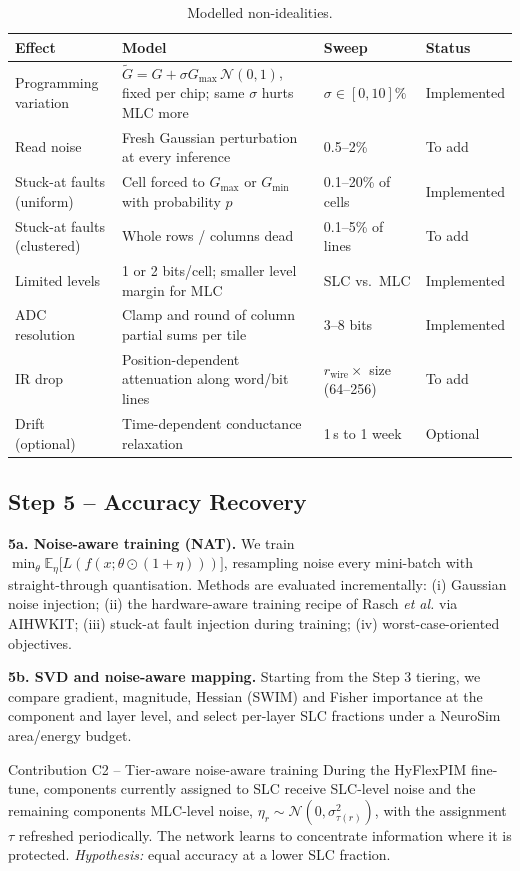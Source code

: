 \documentclass[10pt,a4paper]{article}
\begin{document}
\begin{table}[h]
\centering\small
\caption{Modelled non-idealities.}\label{tab:noise}
\begin{tabularx}{\linewidth}{@{}l X l l@{}}
\toprule
Effect & Model & Sweep & Status \\
\midrule
Programming variation & $\tilde G=G+\sigma G_{\max}\,\mathcal N(0,1)$, fixed per chip; same $\sigma$ hurts MLC more & $\sigma\in[0,10]\%$ & Implemented \\
Read noise & Fresh Gaussian perturbation at every inference & 0.5--2\% & To add \\
Stuck-at faults (uniform) & Cell forced to $G_{\max}$ or $G_{\min}$ with probability $p$ & 0.1--20\% of cells & Implemented \\
Stuck-at faults (clustered) & Whole rows / columns dead & 0.1--5\% of lines & To add \\
Limited levels & 1 or 2 bits/cell; smaller level margin for MLC & SLC vs.\ MLC & Implemented \\
ADC resolution & Clamp and round of column partial sums per tile & 3--8 bits & Implemented \\
IR drop & Position-dependent attenuation along word/bit lines & $r_{\mathrm{wire}}\times$ size (64--256) & To add \\
Drift (optional) & Time-dependent conductance relaxation & 1\,s to 1 week & Optional \\
\bottomrule
\end{tabularx}
\end{table}

\subsection{Step 5 -- Accuracy Recovery}
\textbf{5a. Noise-aware training (NAT).} We train
$\min_\theta \mathbb E_\eta\big[L(f(x;\theta\odot(1+\eta)))\big]$, resampling noise every mini-batch with
straight-through quantisation. Methods are evaluated incrementally: (i) Gaussian noise injection;
(ii) the hardware-aware training recipe of Rasch \emph{et al.} via AIHWKIT; (iii) stuck-at fault injection
during training; (iv) worst-case-oriented objectives.

\textbf{5b. SVD and noise-aware mapping.} Starting from the Step 3 tiering, we compare gradient,
magnitude, Hessian (SWIM) and Fisher importance at the component and layer level, and select per-layer
SLC fractions under a NeuroSim area/energy budget.

\begin{contribbox}{Contribution C2 -- Tier-aware noise-aware training}
During the HyFlexPIM fine-tune, components currently assigned to SLC receive SLC-level noise and the
remaining components MLC-level noise, $\eta_r\sim\mathcal N(0,\sigma^2_{\tau(r)})$, with the assignment
$\tau$ refreshed periodically. The network learns to concentrate information where it is protected.
\emph{Hypothesis:} equal accuracy at a lower SLC fraction.
\end{contribbox}
\end{document}
